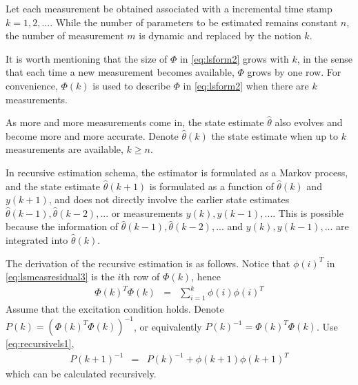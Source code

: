 Let each measurement be obtained associated with a incremental time stamp $k=1, 2, ...$. While the number of parameters to be estimated remains constant $n$, the number of measurement $m$ is dynamic and replaced by the notion $k$.

It is worth mentioning that the size of $\Phi$ in \eqref{eq:lsform2} grows with $k$, in the sense that each time a new measurement becomes available, $\Phi$ grows by one row. For convenience, $\Phi(k)$ is used to describe $\Phi$ in \eqref{eq:lsform2} when there are $k$ measurements.

As more and more measurements come in, the state estimate $\hat{\theta}$ also evolves and become more and more accurate. Denote $\hat{\theta}(k)$ the state estimate when up to $k$ measurements are available, $k \geq n$.

In recursive estimation schema, the estimator is formulated as a Markov process, and the state estimate $\hat{\theta}(k+1)$ is formulated as a function of $\hat{\theta}(k)$ and $y(k+1)$, and does not directly involve the earlier state estimates $\hat{\theta}(k-1), \hat{\theta}(k-2), ...$ or measurements $y(k), y(k-1), ...$. This is possible because the information of $\hat{\theta}(k-1), \hat{\theta}(k-2), ...$ and $y(k), y(k-1), ...$ are integrated into $\hat{\theta}(k)$.

The derivation of the recursive estimation is as follows. Notice that $\phi(i)^T$ in \eqref{eq:lsmeasresidual3} is the $i$th row of $\Phi(k)$, hence
\begin{eqnarray}
  \Phi(k)^T\Phi(k) &=& \sum_{i=1}^{k} \phi(i)\phi(i)^T \label{eq:recursivels1}
\end{eqnarray}
Assume that the excitation condition holds. Denote $P(k) = \left(\Phi(k)^T\Phi(k)\right)^{-1}$, or equivalently $P(k)^{-1} = \Phi(k)^T\Phi(k)$. Use \eqref{eq:recursivels1},
\begin{eqnarray}
  P(k+1)^{-1} &=& P(k)^{-1} + \phi(k+1)\phi(k+1)^T \label{eq:recursivels2}
\end{eqnarray}
which can be calculated recursively.

